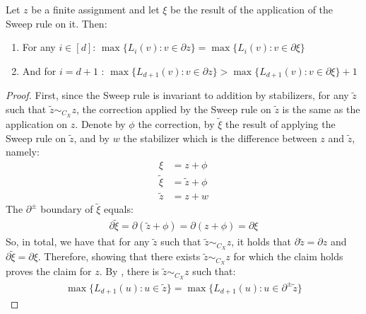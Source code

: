 \begin{claim}
Let $z$ be a finite assignment and let $\xi$ be the result of the application of the Sweep rule on it. Then: 
  \begin{enumerate}
    \item For any $i \in [d]$: $\max \big\{ L_{i}(v) : v \in \partial z \big\} = \max \big\{ L_{i}(v) : v \in \partial \xi \big\}  $
    \item And for $i = d+1$ : $ \max \big\{ L_{d+1}(v)  : v \in \partial z \big\} > \max \big\{  L_{d+1}(v) : v \in \partial \xi \big\} + 1$
  \end{enumerate}
\end{claim}
\begin{proof}
First, since the Sweep rule is invariant to addition by stabilizers, for any $\tilde{z}$ such that $\tilde{z} \sim_{C_{X}} z$, the correction applied by the Sweep rule on $\tilde{z}$ is the same as the application on $z$. Denote by $\phi$ the correction, by $\tilde{\xi}$ the result of applying the Sweep rule on $\tilde{z}$, and by $w$ the stabilizer which is the difference between $z$ and $\tilde{z}$, namely:
  \begin{equation*}
    \begin{split}
      \xi &= z + \phi \\
      \tilde{\xi} &= \tilde{z} + \phi \\
      \tilde{z} &= z + w
    \end{split}
  \end{equation*}
  The $\partial^{\pm}$ boundary of $\tilde{\xi}$ equals:
  \begin{equation*}
    \begin{split}
      \partial \tilde{\xi} = \partial \left( \tilde{z} + \phi \right) = \partial \left( z + \phi \right) = \partial \xi
    \end{split}
  \end{equation*}
  So, in total, we have that for any $\tilde{z}$ such that $\tilde{z} \sim_{C_{X}} z$, it holds that $\partial \tilde{z} = \partial z$ and $\partial \tilde{\xi} = \partial \xi$. Therefore, showing that there exists $\tilde{z} \sim_{C_{X}} z$ for which the claim holds proves the claim for $z$. By , there is $\tilde{z} \sim_{C_{X}} z$ such that:
  \begin{equation*}
    \begin{split}
      \max \big\{ L_{d+1}(u) :  u \in \tilde{z} \big\} = \max \big\{ L_{d+1}(u) : u \in \partial^{\pm} \tilde{z} \big\}
    \end{split}
  \end{equation*}
  

\end{proof}
